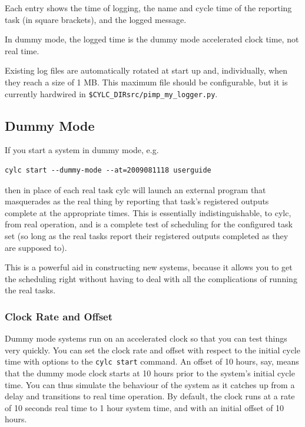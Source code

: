 \documentclass[11pt,a4paper]{article}
\begin{document}

Each entry shows the time of logging, the name and cycle time of the
reporting task (in square brackets), and the logged message.

In dummy mode, the logged time is the dummy mode accelerated clock time, not 
real time.

Existing log files are automatically rotated at start up and,
individually, when they reach a size of 1 MB.  This maximum file 
should be configurable, but it is currently hardwired in
\lstinline=$CYLC_DIRsrc/pimp_my_logger.py=.

\subsection{Dummy Mode} 
\label{DummyMode}

If you start a system in dummy mode, e.g.\:

\begin{lstlisting}
cylc start --dummy-mode --at=2009081118 userguide
\end{lstlisting}

then in place of each real task cylc will launch an external program
that masquerades as the real thing by reporting that task's registered
outputs complete at the appropriate times. This is essentially
indistinguishable, to cylc, from real operation, and is a complete test
of scheduling for the configured task set (so long as the real tasks
report their registered outputs completed as they are supposed to). 

This is a powerful aid in constructing new systems, because it allows
you to get the scheduling right without having to deal with all the
complications of running the real tasks.

\subsubsection{Clock Rate and Offset}

Dummy mode systems run on an accelerated clock so that you can test
things very quickly. You can set the clock rate and offset with respect
to the initial cycle time with options to the \lstinline=cylc start=
command. An offset of 10 hours, say, means that the dummy mode clock
starts at 10 hours prior to the system's initial cycle time.  You can
thus simulate the behaviour of the system as it catches up from a delay
and transitions to real time operation.  By default, the clock runs at a
rate of 10 seconds real time to 1 hour system time, and with an initial
offset of 10 hours. 
\end{document}
